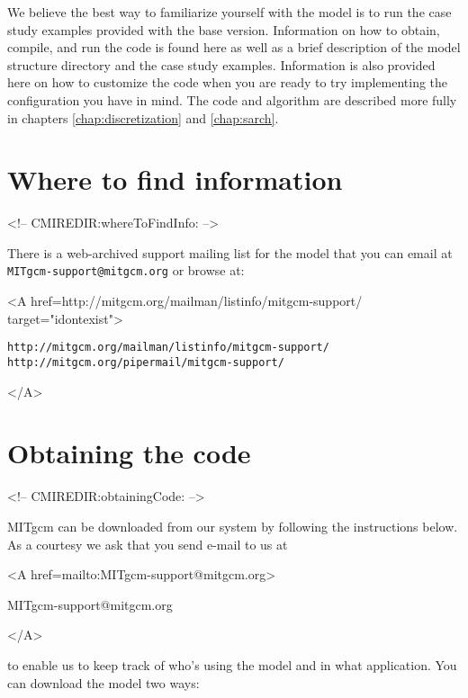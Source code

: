 

We believe the best way to familiarize yourself with the
model is to run the case study examples provided with the base
version. Information on how to obtain, compile, and run the code is
found here as well as a brief description of the model structure
directory and the case study examples. Information is also provided
here on how to customize the code when you are ready to try implementing 
the configuration you have in mind.  The code and algorithm
are described more fully in chapters \ref{chap:discretization} and 
\ref{chap:sarch}. 

\section{Where to find information}
\label{sect:whereToFindInfo}
\begin{rawhtml}
<!-- CMIREDIR:whereToFindInfo: -->
\end{rawhtml}

There is a web-archived support mailing list for the model that
you can email at \texttt{MITgcm-support@mitgcm.org} or browse at:
\begin{rawhtml} <A href=http://mitgcm.org/mailman/listinfo/mitgcm-support/ target="idontexist"> \end{rawhtml}
\begin{verbatim}
http://mitgcm.org/mailman/listinfo/mitgcm-support/
http://mitgcm.org/pipermail/mitgcm-support/
\end{verbatim}
\begin{rawhtml} </A> \end{rawhtml}

\section{Obtaining the code}
\label{sect:obtainingCode}
\begin{rawhtml}
<!-- CMIREDIR:obtainingCode: -->
\end{rawhtml}

MITgcm can be downloaded from our system by following
the instructions below. As a courtesy we ask that you send e-mail to us at
\begin{rawhtml} <A href=mailto:MITgcm-support@mitgcm.org> \end{rawhtml}
MITgcm-support@mitgcm.org
\begin{rawhtml} </A> \end{rawhtml}
to enable us to keep track of who's using the model and in what application.
You can download the model two ways:

